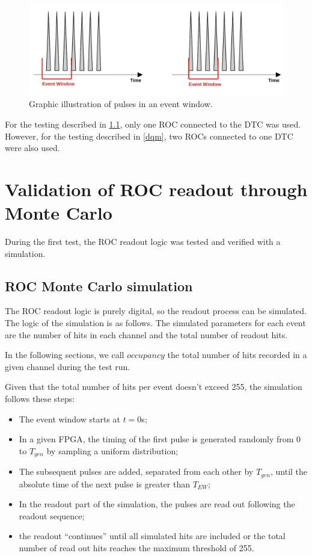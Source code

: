     \begin{figure}[!h]
    \centering
    \includegraphics[width =\textwidth]{figures/png/finalimg.png}
    \caption{Graphic illustration of pulses in an event window.}
    \label{fig:3}
    \end{figure}
    For the testing described in \ref{MonteCarlo}, only one ROC connected to the DTC was used. However, for the testing described in \ref{dqm}, two ROCs connected to one DTC were also used.
\section{Validation of ROC readout through Monte Carlo}
During the first test, the ROC readout logic was tested and verified with a simulation.
\subsection{ROC Monte Carlo simulation}\label{MonteCarlo}
 
The ROC readout logic is purely digital, so the readout process can be simulated. 
The logic of the simulation is as follows.
The simulated parameters for each event are the number of hits in each channel
and the total number of readout hits.

In the following sections, we call $occupancy$ the total number of hits
recorded in a given channel during the test run.

Given that the total number of hits per event doesn't exceed 255, the simulation follows these steps:
\begin{itemize}
\item
  The event window starts at $t=0$s;
\item
  In a given FPGA, the timing of the first pulse is generated randomly from 0 to $T_{gen}$
  by sampling a uniform distribution;
\item
  The subsequent pulses are added, separated from each other by $T_{gen}$,
  until the absolute time
  of the next pulse is greater than $T_{EW}$;
\item
  In the readout part of the simulation, the pulses are read out following the readout sequence;
\item
  the readout ``continues'' until all simulated hits are included or
  the total number of read out hits reaches the maximum threshold of 255. 
\end{itemize}

